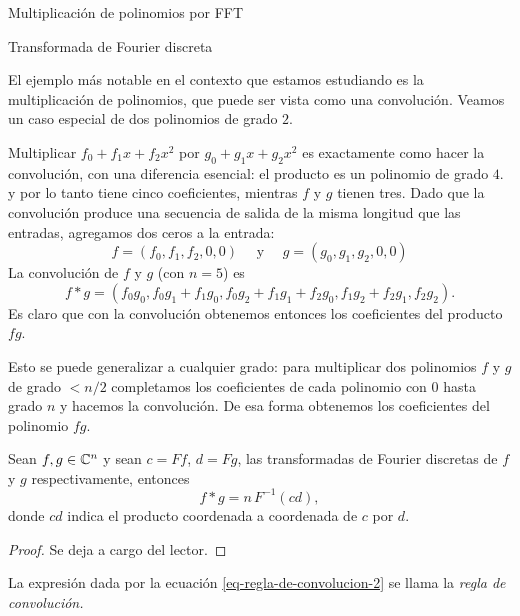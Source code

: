 \begin{chapter}{Multiplicación de polinomios por FFT}
\begin{section}{Transformada de Fourier discreta}
        \begin{ejemplo}\label{ejem-convolucion-polinomios}
            El ejemplo más notable en el contexto  que estamos estudiando es la multiplicación de polinomios, que puede ser vista como  una convolución. Veamos un caso especial de dos polinomios de grado $2$. 
            
            Multiplicar $f_0 + f_1x + f_2x^2$ por $g_0 + g_1x + g_2x^2$ es exactamente como hacer la convolución, con una diferencia esencial: el producto es un polinomio de grado $4$. y por lo tanto tiene cinco coeficientes, mientras $f$ y $g$ tienen tres. Dado que la convolución produce una secuencia de salida de la misma longitud que las entradas, agregamos dos ceros a la entrada:
            \begin{equation*}
                f = (f_0,f_1,f_2,0,0) \quad \text{ y }\quad g = (g_0,g_1,g_2,0,0)
            \end{equation*}
            La convolución de $f$ y $g$ (con $n = 5$) es 
            \begin{equation*}
                f * g = (f_0g_0, f_0g_1 + f_1g_0 , f_0g_2 + f_1g_1+ f_2g_0, f_1g_2 + f_2g_1, f_2g_2 ).
            \end{equation*}
            Es claro que con la convolución obtenemos entonces  los coeficientes del producto $fg$. 

            Esto se puede generalizar a cualquier grado:  para multiplicar dos polinomios $f$ y $g$ de grado $<n/2$ completamos los coeficientes de cada polinomio  con $0$ hasta grado $n$ y hacemos la convolución. De esa forma obtenemos los coeficientes del polinomio $fg$. 
        \end{ejemplo}


        \begin{teorema}\label{th-prod-convolucion-dft}
            Sean $f,g \in \mathbb C^n$ y  sean $c= Ff$, $d = Fg$, las transformadas de Fourier discretas de $f$ y $g$ respectivamente, entonces
            \begin{equation}\label{eq-regla-de-convolucion-2}
                f * g = n\,  F^{-1}(cd),
            \end{equation}
            donde $cd$  indica el producto coordenada a coordenada de $c$ por $d$. 
        \end{teorema}
        \begin{proof}
            Se deja a cargo del lector.
        \end{proof}

        La expresión dada por la ecuación  \eqref{eq-regla-de-convolucion-2} se llama la  \textit{regla de convolución.}


\end{section}
\end{chapter}
